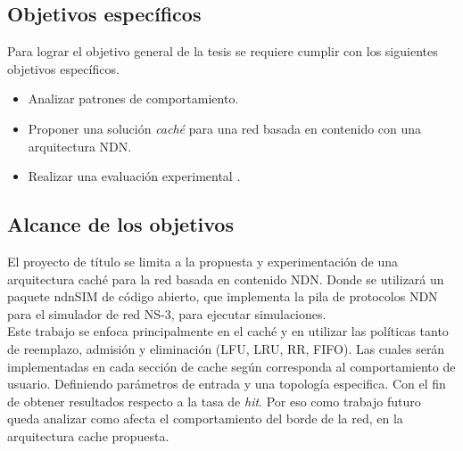 \documentclass[12pt]{ociamthesis}  %
\begin{document}
\subsection{Objetivos específicos}
Para lograr el objetivo general de la tesis se requiere cumplir con los siguientes objetivos específicos.
\begin{itemize}
	\item Analizar patrones de comportamiento.
	\item Proponer una solución \textit{caché} para una red basada en contenido con una arquitectura NDN.
	\item Realizar una evaluación experimental .
\end{itemize}


\subsection{Alcance de los objetivos}

El proyecto de título se limita a la propuesta y experimentación de una arquitectura caché para la red basada en contenido NDN. Donde se utilizará un  paquete ndnSIM de código abierto, que implementa la pila de protocolos NDN para el simulador de red NS-3, para ejecutar simulaciones.\\

Este trabajo se enfoca principalmente en el caché y en  utilizar las políticas tanto de reemplazo, admisión y eliminación (LFU, LRU, RR, FIFO). Las cuales serán implementadas en cada sección de cache según corresponda al comportamiento de usuario. Definiendo parámetros de entrada y una topología especifica. Con el fin de obtener resultados respecto a la tasa de \textit{hit}. Por eso como trabajo futuro queda analizar como afecta el comportamiento del borde de la red, en la arquitectura cache propuesta.
\end{document}
